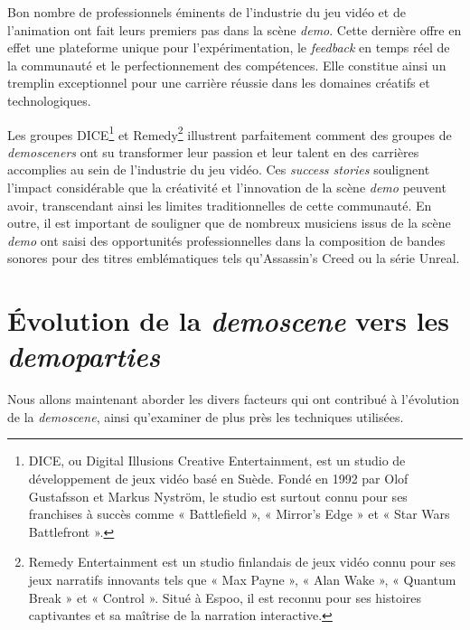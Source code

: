 Bon nombre de professionnels éminents de l'industrie du jeu vidéo et de l'animation ont fait leurs premiers pas dans la scène \textit{demo}. Cette dernière offre en effet une plateforme unique pour l'expérimentation, le \textit{feedback} en temps réel de la communauté et le perfectionnement des compétences. Elle constitue ainsi un tremplin exceptionnel pour une carrière réussie dans les domaines créatifs et technologiques.

Les groupes DICE\footnote{DICE, ou Digital Illusions Creative Entertainment, est un studio de développement de jeux vidéo basé en Suède. Fondé en 1992 par Olof Gustafsson et Markus Nyström, le studio est surtout connu pour ses franchises à succès comme « Battlefield », « Mirror's Edge » et « Star Wars Battlefront ».} et Remedy\footnote{Remedy Entertainment est un studio finlandais de jeux vidéo connu pour ses jeux narratifs innovants tels que « Max Payne », « Alan Wake », « Quantum Break » et « Control ». Situé à Espoo, il est reconnu pour ses histoires captivantes et sa maîtrise de la narration interactive.} illustrent parfaitement comment des groupes de \textit{demosceners} ont su transformer leur passion et leur talent en des carrières accomplies au sein de l'industrie du jeu vidéo. Ces \textit{success stories} soulignent l'impact considérable que la créativité et l'innovation de la scène \textit{demo} peuvent avoir, transcendant ainsi les limites traditionnelles de cette communauté. En outre, il est important de souligner que de nombreux musiciens issus de la scène \textit{demo} ont saisi des opportunités professionnelles dans la composition de bandes sonores pour des titres emblématiques tels qu'Assassin's Creed ou la série Unreal.



\newpage
\section{Évolution de la \textit{demoscene} vers les \textit{demoparties}}

Nous allons maintenant aborder les divers facteurs qui ont contribué à l'évolution de la \textit{demoscene}, ainsi qu'examiner de plus près les techniques utilisées.

